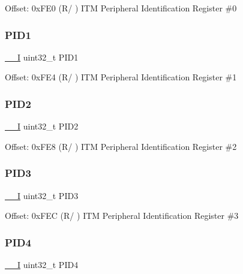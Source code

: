 Offset\+: 0x\+F\+E0 (R/ ) I\+TM Peripheral Identification Register \#0 \mbox{\label{struct_i_t_m___type_ae554433b6f6c4733d222bcb2c75ccb39}} 
\subsubsection{\texorpdfstring{P\+I\+D1}{PID1}}
{\footnotesize\ttfamily \mbox{\hyperlink{core__cm3_8h_af63697ed9952cc71e1225efe205f6cd3}{\+\_\+\+\_\+I}} uint32\+\_\+t P\+I\+D1}

Offset\+: 0x\+F\+E4 (R/ ) I\+TM Peripheral Identification Register \#1 \mbox{\label{struct_i_t_m___type_af07d9a44e0188d55742f5d6a8752cd2c}} 
\subsubsection{\texorpdfstring{P\+I\+D2}{PID2}}
{\footnotesize\ttfamily \mbox{\hyperlink{core__cm3_8h_af63697ed9952cc71e1225efe205f6cd3}{\+\_\+\+\_\+I}} uint32\+\_\+t P\+I\+D2}

Offset\+: 0x\+F\+E8 (R/ ) I\+TM Peripheral Identification Register \#2 \mbox{\label{struct_i_t_m___type_a510fcf8ad6966fdfb0767e624b74c64f}} 
\subsubsection{\texorpdfstring{P\+I\+D3}{PID3}}
{\footnotesize\ttfamily \mbox{\hyperlink{core__cm3_8h_af63697ed9952cc71e1225efe205f6cd3}{\+\_\+\+\_\+I}} uint32\+\_\+t P\+I\+D3}

Offset\+: 0x\+F\+EC (R/ ) I\+TM Peripheral Identification Register \#3 \mbox{\label{struct_i_t_m___type_ad75960b83ea47a469e6a1406dd9eefa6}} 
\subsubsection{\texorpdfstring{P\+I\+D4}{PID4}}
{\footnotesize\ttfamily \mbox{\hyperlink{core__cm3_8h_af63697ed9952cc71e1225efe205f6cd3}{\+\_\+\+\_\+I}} uint32\+\_\+t P\+I\+D4}


